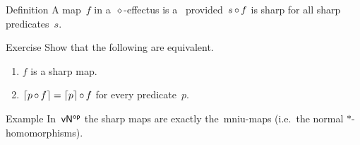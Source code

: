 \documentclass[b]{subfiles}
\begin{document}
\begin{parsec}%
\begin{point}{Definition}%
A map~$f$ in a~$\diamond$-effectus is a~
    provided~$s \mathop{\circ} f$ is sharp for all sharp predicates~$s$.
\end{point}
\begin{point}{Exercise}%
Show that the following are equivalent.
\begin{enumerate}
    \item $f$ is a sharp map.
    \item $\left\lceil p \mathop{\circ} f\right\rceil = \left\lceil p\right\rceil\mathop{\circ} f$
            for every predicate~$p$.
\end{enumerate}
\end{point}

\begin{point}{Example}%
In~${\mathsf{vN}}{^{\mathsf{op}}}$ the sharp maps are exactly the~mniu-maps
(i.e.~the normal $*$-homomorphisms). 
\end{point}
    
\end{parsec}
\end{document}
